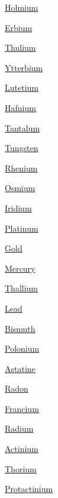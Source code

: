 \begin{DoxyCompactItemize}
\item 
\mbox{\hyperlink{group___isotope_const-_holmium}{Holmium}}
\item 
\mbox{\hyperlink{group___isotope_const-_erbium}{Erbium}}
\item 
\mbox{\hyperlink{group___isotope_const-_thulium}{Thulium}}
\item 
\mbox{\hyperlink{group___isotope_const-_ytterbium}{Ytterbium}}
\item 
\mbox{\hyperlink{group___isotope_const-_lutetium}{Lutetium}}
\item 
\mbox{\hyperlink{group___isotope_const-_hafnium}{Hafnium}}
\item 
\mbox{\hyperlink{group___isotope_const-_tantalum}{Tantalum}}
\item 
\mbox{\hyperlink{group___isotope_const-_tungsten}{Tungsten}}
\item 
\mbox{\hyperlink{group___isotope_const-_rhenium}{Rhenium}}
\item 
\mbox{\hyperlink{group___isotope_const-_osmium}{Osmium}}
\item 
\mbox{\hyperlink{group___isotope_const-_iridium}{Iridium}}
\item 
\mbox{\hyperlink{group___isotope_const-_platinum}{Platinum}}
\item 
\mbox{\hyperlink{group___isotope_const-_gold}{Gold}}
\item 
\mbox{\hyperlink{group___isotope_const-_mercury}{Mercury}}
\item 
\mbox{\hyperlink{group___isotope_const-_thallium}{Thallium}}
\item 
\mbox{\hyperlink{group___isotope_const-_lead}{Lead}}
\item 
\mbox{\hyperlink{group___isotope_const-_bismuth}{Bismuth}}
\item 
\mbox{\hyperlink{group___isotope_const-_polonium}{Polonium}}
\item 
\mbox{\hyperlink{group___isotope_const-_astatine}{Astatine}}
\item 
\mbox{\hyperlink{group___isotope_const-_radon}{Radon}}
\item 
\mbox{\hyperlink{group___isotope_const-_francium}{Francium}}
\item 
\mbox{\hyperlink{group___isotope_const-_radium}{Radium}}
\item 
\mbox{\hyperlink{group___isotope_const-_actinium}{Actinium}}
\item 
\mbox{\hyperlink{group___isotope_const-_thorium}{Thorium}}
\item 
\mbox{\hyperlink{group___isotope_const-_protactinium}{Protactinium}}

\end{DoxyCompactItemize}

